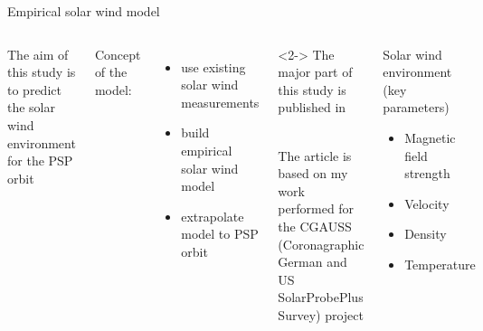 \begin{frame}[plain,c]{Empirical solar wind model}{}
	\begin{columns}[c]
		
		The aim of this study is to predict the solar wind environment for the PSP orbit\\\ 
		
		Concept of the model:
		\begin{itemize}
			\item use existing solar wind measurements
			\item build empirical solar wind model
			\item extrapolate model to PSP orbit
		\end{itemize}
		\vspace{1cm}
		\begin{block}<2->{}
			\footnotesize
			The major part of this study is published in \citet{Venzmer2018}\\\ 
			
			The article is based on my work performed for the CGAUSS (Coronagraphic German and US SolarProbePlus Survey) project
		\end{block}
			
		
		\begin{block}{Solar wind environment (key parameters)}
			\begin{itemize}
				\item Magnetic field strength
				\item Velocity
				\item Density
				\item Temperature
			\end{itemize}
		\end{block}
		\vspace{5mm}
	\end{columns}
\end{frame}

